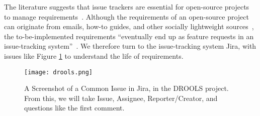 \begin{table}[!t]
  \centering
  \small
  \caption{Select Questions with Identified Answers from DROOLS}
  \tabcolsep=0.11cm
  \label{tab:drools}
\end{table}


The literature suggests that issue trackers are essential for open-source projects to manage requirements~\cite{ICSE5,ICSE25,ICSE33,ICSE40,ICSE60}. Although the requirements of an open-source project can originate from emails, how-to guides, and other socially lightweight sources~\cite{ICSE62}, the to-be-implemented requirements ``eventually end up as feature requests in an issue-tracking system''~\cite{ICSE33}. We therefore turn to the issue-tracking system Jira, with issues like Figure \ref{fig:drools} to understand the life of requirements.

\begin{figure}
  \centering
  \texttt{[image: drools.png]}
  \caption{A Screenshot of a Common Issue in Jira, in the DROOLS project. From this, we will take Issue, Assignee, Reporter/Creator, and questions like the first comment.}
  \label{fig:drools}
\end{figure}


